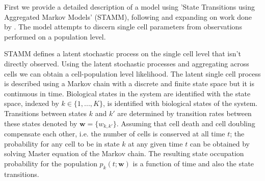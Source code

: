 First we provide a detailed description of a model using 'State Transitions using Aggregated Markov Models' (STAMM), following and expanding on work done by \cite{Armond:2013}. The model attempts to discern single cell parameters from observations performed on a population level.  

STAMM defines a latent stochastic process on the single cell level that isn't directly observed. Using the latent stochastic processes and aggregating across cells we can obtain a cell-population level likelihood. The latent single cell process is described using a Markov chain with a discrete and finite state space but it is continuous in time. Biological states in the system are identified with the state space, indexed by $k \in \lbrace 1, ..., K \rbrace$, is identified with biological states of the system. Transitions between states $k$ and $k'$ are determined by transition rates between these states denoted by $\mathbf{w} = \lbrace w_{k,k'} \rbrace $. Assuming that cell death and cell doubling compensate each other, i.e. the number of cells is conserved at all time $t$; the probability for any cell to be in state $k$ at any given time $t$ can be obtained by solving Master equation of the Markov chain. The resulting state occupation probability for the population $p_k(t;\mathbf{w})$ is a function of time and also the state transitions.

